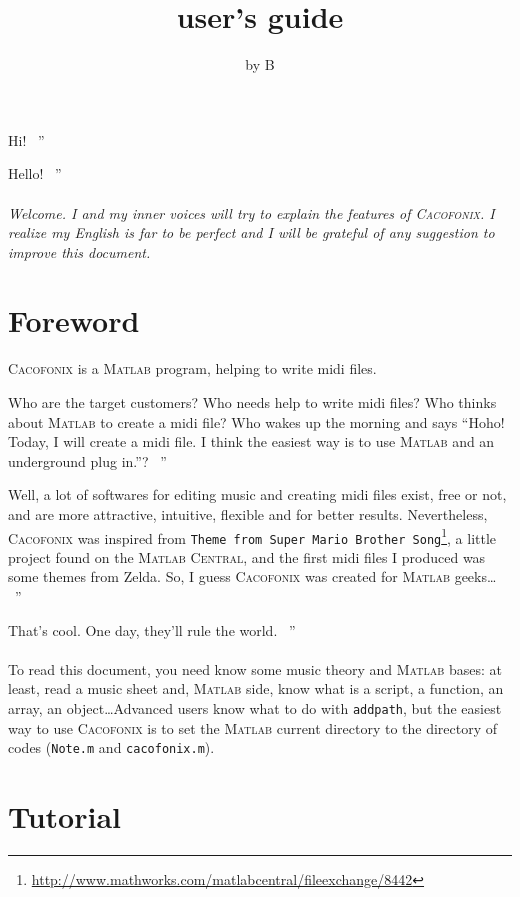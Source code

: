 \documentclass{article}
\title{\cacofonix user's guide}
\author{by B}
\date{}
\newcommand\cacofonix{\textsc{Cacofonix}\xspace}
\newcommand\matlab{\textsc{Matlab}\xspace}
\newcommand\noteFile{\texttt{Note.m}\xspace}
\newcommand\cacofonixFile{\texttt{cacofonix.m}\xspace}
\newcommand\exchange[2]{\texttt{#1}\footnote{\url{#2}}\xspace}
\newenvironment{meenv}{ \par \noindent \makebox[6em][r]{ \textcolor{mecolor}{Me}: `` --~}}{~''}
\newenvironment{myselfenv}{ \par \noindent \makebox[6em][r]{ \textcolor{myselfcolor}{Myself}: `` --~}}{~''}
\newcommand{ \me }[1]{%
\begin{meenv}%
	#1%
\end{meenv} }
\newcommand{ \myself }[1]{%
\begin{myselfenv}%
	#1%
\end{myselfenv} }
\begin{document}
\maketitle

\me{Hi!}
\myself{Hello!}

\paragraph{}

\emph{Welcome. I and my inner voices will try to explain the features of \cacofonix. I realize my English is far to be perfect and I will be grateful of any suggestion to improve this document.}

\tableofcontents

\section{Foreword}

\cacofonix is a \matlab program, helping to write midi files.

\me{Who are the target customers? Who needs help to write midi files? Who thinks about \matlab to create a midi file? Who wakes up the morning and says ``Hoho! Today, I will create a midi file. I think the easiest way is to use \matlab and an underground plug in.''?}
\myself{Well, a lot of softwares for editing music and creating midi files exist, free or not, and are more attractive, intuitive, flexible and for better results. Nevertheless, \cacofonix was inspired from \exchange{Theme from Super Mario Brother Song}{http://www.mathworks.com/matlabcentral/fileexchange/8442}, a little project found on the \textsc{Matlab Central}, and the first midi files I produced was some themes from Zelda. So, I guess \cacofonix was created for \matlab geeks\dots}
\me{That's cool. One day, they'll rule the world.}

\paragraph{}

To read this document, you need know some music theory and \matlab bases: at least, read a music sheet and, \matlab side, know what is a script, a function, an array, an object\dots Advanced users know what to do with \lstinline!addpath!, but the easiest way to use \cacofonix is to set the \matlab current directory to the directory of codes (\noteFile and \cacofonixFile).

\section{Tutorial}
\end{document}
